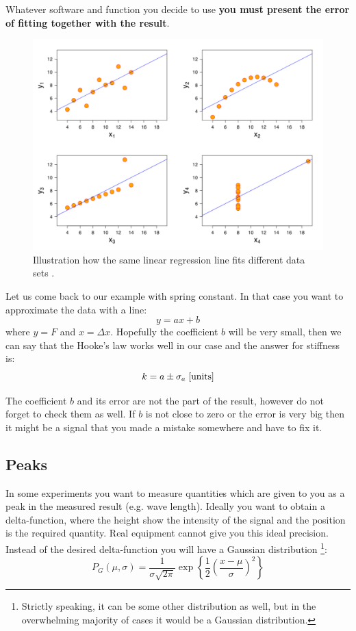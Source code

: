 \documentclass[12pt,a4paper]{article}
\begin{document}
Whatever software and function you decide to use \textbf{you must present the error of fitting together with the result}.
\begin{figure} \label{fig:fitting}
	\centering
	\vskip -1cm
	\includegraphics[width=.9\linewidth]{Anscombe's_quartet_3.pdf}
	\vskip -0.5cm
	\caption[]{Illustration how the same linear regression line fits different data sets \protect\footnotemark.}
\end{figure}

Let us come back to our example with spring constant. In that case you want to approximate the data with a line:
\begin{equation}
y = ax + b
\end{equation}
where $y = F$ and $x = \Delta x$. Hopefully the coefficient $b$ will be very small, then we can say that the Hooke's law works well in our case and the answer for stiffness is:
\begin{equation}
k = a\pm \sigma_a\;[\rm{units}]
\end{equation}

The coefficient $b$ and its error are not the part of the result, however do not forget to check them as well. If $b$ is not close to zero or the error is very big then it might be a signal that you made a mistake somewhere and have to fix it.

\subsection{Peaks}
In some experiments you want to measure quantities which are given to you as a peak in the measured result (e.g. wave length). Ideally you want to obtain a delta-function, where the height show the intensity of the signal and the position is the required quantity. Real equipment cannot give you this ideal precision. Instead of the desired delta-function you will have a Gaussian distribution \footnote{Strictly speaking, it can be some other distribution as well, but in the overwhelming majority of cases it would be a Gaussian distribution.}:
\begin{equation}
P_G(\mu, \sigma) = \frac{1}{\sigma \sqrt{2\pi}}\exp\left\lbrace\frac{1}{2}\left(\frac{x-\mu}{\sigma}\right)^2\right\rbrace
\end{equation}
\end{document}
